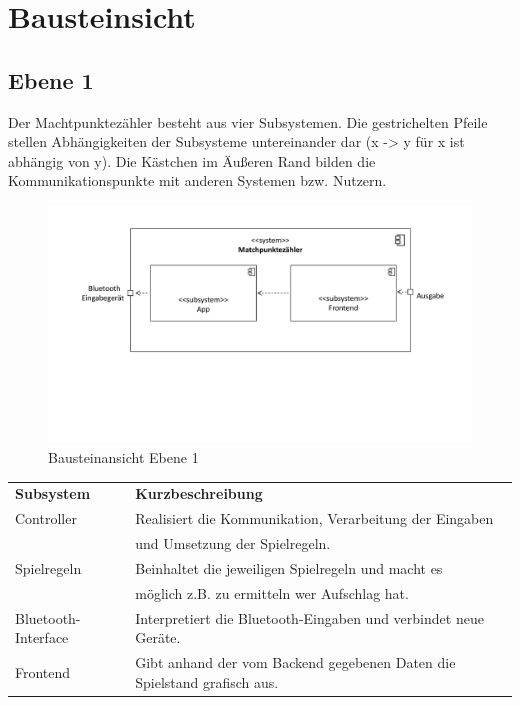 \chapter{Bausteinsicht}

\section{Ebene 1}

Der Machtpunktezähler besteht aus vier Subsystemen. Die gestrichelten Pfeile stellen Abhängigkeiten der Subsysteme untereinander dar (x -> y für x ist abhängig von y). Die Kästchen im Äußeren Rand bilden die Kommunikationspunkte mit anderen Systemen bzw. Nutzern.

\begin{figure}[h]
\begin{center}
\includegraphics[scale=0.5]{Grafiken/Baustein_1.pdf}
\caption{Bausteinansicht Ebene 1}
\end{center}
\end{figure}

\begin{center}
\begin{tabular}[h]{|l|l|}
\cline{1-2}
\textbf{Subsystem} & \textbf{Kurzbeschreibung}\\
\cline{1-2}
Controller & Realisiert die Kommunikation, Verarbeitung der Eingaben\\&und Umsetzung der Spielregeln.\\ 
\cline{1-2}
Spielregeln & Beinhaltet die jeweiligen Spielregeln und macht es\\&möglich z.B. zu ermitteln wer Aufschlag hat.\\
\cline{1-2}
Bluetooth-Interface & Interpretiert die Bluetooth-Eingaben und verbindet neue Geräte.\\
\cline{1-2}
Frontend & Gibt anhand der vom Backend gegebenen Daten die Spielstand grafisch aus.\\
\cline{1-2} 
\end{tabular}
\end{center}

